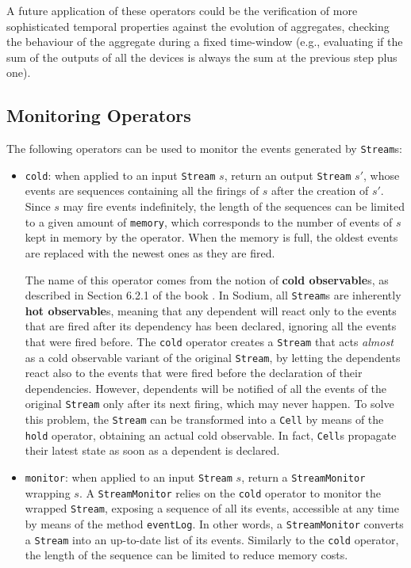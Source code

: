 A future application of these operators could be the verification of more
sophisticated temporal properties against the evolution of aggregates, checking
the behaviour of the aggregate during a fixed time-window (e.g., evaluating if
the sum of the outputs of all the devices is always the sum at the previous
step plus one).

\subsection{Monitoring Operators}

The following operators can be used to monitor the events generated by
\texttt{Stream}s:
\begin{itemize}
  \item \texttt{cold}: when applied to an input \texttt{Stream} $s$, return an
        output \texttt{Stream} $s'$, whose events are sequences containing all
        the firings of $s$ after the creation of $s'$. Since $s$ may fire
        events indefinitely, the length of the sequences can be limited to a
        given amount of \texttt{memory}, which corresponds to the number of
        events of $s$ kept in memory by the operator. When the memory is full,
        the oldest events are replaced with the newest ones as they are fired.

        The name of this operator comes from the notion of \textbf{cold
        observable}s, as described in Section 6.2.1 of the book \cite{FRP}. In
        Sodium, all \texttt{Stream}s are inherently \textbf{hot observable}s,
        meaning that any dependent will react only to the events that are fired
        after its dependency has been declared, ignoring all the events that
        were fired before. The \texttt{cold} operator creates a \texttt{Stream}
        that acts \textit{almost} as a cold observable variant of the original
        \texttt{Stream}, by letting the dependents react also to the events
        that were fired before the declaration of their dependencies. However,
        dependents will be notified of all the events of the original
        \texttt{Stream} only after its next firing, which may never happen. To
        solve this problem, the \texttt{Stream} can be transformed into a
        \texttt{Cell} by means of the \texttt{hold} operator, obtaining an
        actual cold observable. In fact, \texttt{Cell}s propagate their latest
        state as soon as a dependent is declared.

  \item \texttt{monitor}: when applied to an input \texttt{Stream} $s$, return
        a \texttt{StreamMonitor} wrapping $s$. A \texttt{StreamMonitor} relies
        on the \texttt{cold} operator to monitor the wrapped \texttt{Stream},
        exposing a sequence of all its events, accessible at any time by means
        of the method \texttt{eventLog}. In other words, a
        \texttt{StreamMonitor} converts a \texttt{Stream} into an up-to-date
        list of its events. Similarly to the \texttt{cold} operator, the length
        of the sequence can be limited to reduce memory costs.
\end{itemize}

